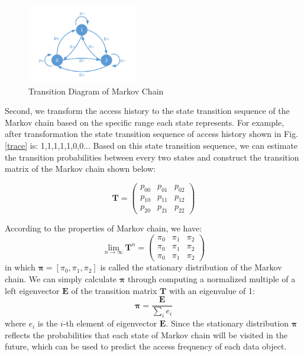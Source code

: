 \begin{figure}[!t]
\centering
\includegraphics[width=1.9in]{./transition.pdf}
\caption{Transition Diagram of Markov Chain}
\vspace{-0.25in}
\label{transitioin}
\end{figure}

Second, we transform the access history to the state transition sequence of the Markov chain based on the specific range each state represents. For example, after transformation the state transition sequence of access history shown in Fig. \ref{trace} is: 1,1,1,1,1,0,0...  Based on this state transition sequence, we can estimate the transition probabilities between every two states and construct the transition matrix of the Markov chain shown below:

\begin{equation}
\mathbf{T} =
 \begin{pmatrix}
  p_{00} & p_{01} & p_{02} \\
  p_{10} & p_{11} & p_{12} \\
  p_{20} & p_{21} & p_{22}
 \end{pmatrix}
\end{equation}

According to the properties of Markov chain, we have:
\begin{equation}
\lim_{n\to\infty}\mathbf{T}^{n} =
 \begin{pmatrix}
  \pi_{0} & \pi_{1} & \pi_{2} \\
  \pi_{0} & \pi_{1} & \pi_{2} \\
  \pi_{0} & \pi_{1} & \pi_{2}
 \end{pmatrix}
\end{equation}
in which $\boldsymbol{\pi} = [\pi_{0}, \pi_{1},  \pi_{2}]$ is called the stationary distribution of the Markov chain. We can simply calculate $\boldsymbol{\pi} $ through computing a normalized multiple of a left eigenvector $\mathbf{E}$ of the transition matrix $\mathbf{T}$ with an eigenvalue of 1:
\begin{equation}
\boldsymbol{\pi} = \frac{\mathbf{E}}{\sum_{i}e_{i}}
\end{equation}
where $e_{i}$ is the $i$-th element of eigenvector $\mathbf{E}$. Since the stationary distribution $\boldsymbol{\pi}$ reflects the probabilities that each state of Markov chain will be visited in the future, which can be used to predict the access frequency of each data object.

